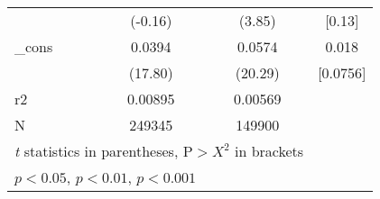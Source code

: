 \begin{table}[htbp]
\begin{tabular}{l*{3}{c}}
            &     (-0.16)         &      (3.85)         &    [0.13]         \\
[1em]
\_cons      &      0.0394\sym{***}&      0.0574\sym{***}&   0.018\\
            &     (17.80)         &     (20.29)         &    [0.0756]         \\
\hline
r2          &     0.00895         &     0.00569\\
N           &      249345         &      149900\\
\hline\hline
\multicolumn{3}{l}{\footnotesize \textit{t} statistics in parentheses, $\text{P}> X^2$ in brackets}\\
\multicolumn{3}{l}{\footnotesize \sym{*} \(p<0.05\), \sym{**} \(p<0.01\), \sym{***} \(p<0.001\)}\\
\end{tabular}
\end{table}
